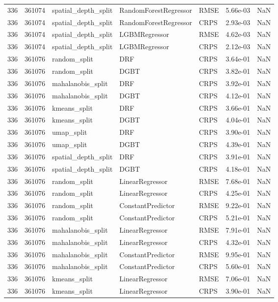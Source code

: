 \begin{tabular}{rrlllrr}
336 & 361074 & spatial\_depth\_split & RandomForestRegressor & RMSE & 5.66e-03 & NaN \\
336 & 361074 & spatial\_depth\_split & RandomForestRegressor & CRPS & 2.93e-03 & NaN \\
336 & 361074 & spatial\_depth\_split & LGBMRegressor & RMSE & 4.62e-03 & NaN \\
336 & 361074 & spatial\_depth\_split & LGBMRegressor & CRPS & 2.12e-03 & NaN \\
336 & 361076 & random\_split & DRF & CRPS & 3.64e-01 & NaN \\
336 & 361076 & random\_split & DGBT & CRPS & 3.82e-01 & NaN \\
336 & 361076 & mahalanobis\_split & DRF & CRPS & 3.92e-01 & NaN \\
336 & 361076 & mahalanobis\_split & DGBT & CRPS & 4.12e-01 & NaN \\
336 & 361076 & kmeans\_split & DRF & CRPS & 3.66e-01 & NaN \\
336 & 361076 & kmeans\_split & DGBT & CRPS & 4.04e-01 & NaN \\
336 & 361076 & umap\_split & DRF & CRPS & 3.90e-01 & NaN \\
336 & 361076 & umap\_split & DGBT & CRPS & 4.39e-01 & NaN \\
336 & 361076 & spatial\_depth\_split & DRF & CRPS & 3.91e-01 & NaN \\
336 & 361076 & spatial\_depth\_split & DGBT & CRPS & 4.18e-01 & NaN \\
336 & 361076 & random\_split & LinearRegressor & RMSE & 7.68e-01 & NaN \\
336 & 361076 & random\_split & LinearRegressor & CRPS & 4.25e-01 & NaN \\
336 & 361076 & random\_split & ConstantPredictor & RMSE & 9.22e-01 & NaN \\
336 & 361076 & random\_split & ConstantPredictor & CRPS & 5.21e-01 & NaN \\
336 & 361076 & mahalanobis\_split & LinearRegressor & RMSE & 7.91e-01 & NaN \\
336 & 361076 & mahalanobis\_split & LinearRegressor & CRPS & 4.32e-01 & NaN \\
336 & 361076 & mahalanobis\_split & ConstantPredictor & RMSE & 9.95e-01 & NaN \\
336 & 361076 & mahalanobis\_split & ConstantPredictor & CRPS & 5.60e-01 & NaN \\
336 & 361076 & kmeans\_split & LinearRegressor & RMSE & 7.06e-01 & NaN \\
336 & 361076 & kmeans\_split & LinearRegressor & CRPS & 3.90e-01 & NaN \\

\end{tabular}
